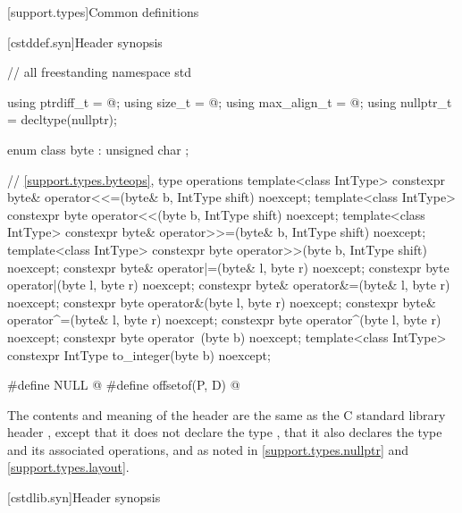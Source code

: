 [support.types]{Common definitions}

[cstddef.syn]{Header  synopsis}

%
%
%
%
%
%
%
\begin{codeblock}
// all freestanding
namespace std {
  using ptrdiff_t = @\seebelow@;
  using size_t = @\seebelow@;
  using max_align_t = @\seebelow@;
  using nullptr_t = decltype(nullptr);

  enum class byte : unsigned char {};

  // \ref{support.types.byteops},  type operations
  template<class IntType>
    constexpr byte& operator<<=(byte& b, IntType shift) noexcept;
  template<class IntType>
    constexpr byte operator<<(byte b, IntType shift) noexcept;
  template<class IntType>
    constexpr byte& operator>>=(byte& b, IntType shift) noexcept;
  template<class IntType>
    constexpr byte operator>>(byte b, IntType shift) noexcept;
  constexpr byte& operator|=(byte& l, byte r) noexcept;
  constexpr byte operator|(byte l, byte r) noexcept;
  constexpr byte& operator&=(byte& l, byte r) noexcept;
  constexpr byte operator&(byte l, byte r) noexcept;
  constexpr byte& operator^=(byte& l, byte r) noexcept;
  constexpr byte operator^(byte l, byte r) noexcept;
  constexpr byte operator~(byte b) noexcept;
  template<class IntType>
    constexpr IntType to_integer(byte b) noexcept;
}

#define NULL @\seebelow@
#define offsetof(P, D) @\seebelow@
\end{codeblock}

\pnum
The contents and meaning of the header  are the same as
the C standard library header ,
except that it does not declare the type ,
that it also declares the type 
and its associated operations,
and as noted in
\ref{support.types.nullptr} and
\ref{support.types.layout}.


[cstdlib.syn]{Header  synopsis}

